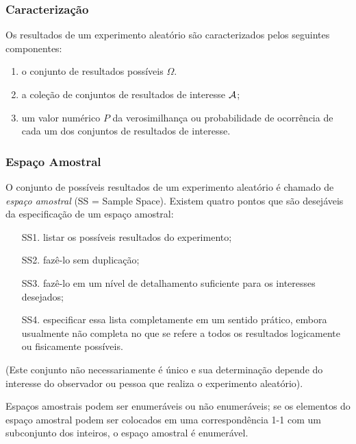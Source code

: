 \begin{frame}
\frametitle{\textbf{Caracterização}}
\baselineskip=13pt
\begin{block}{}

Os resultados de um experimento aleatório são caracterizados pelos
seguintes componentes:

\begin{enumerate}
	\item o conjunto de resultados possíveis $\Omega.$ 
	\item a coleção de conjuntos de resultados de interesse ${\cal A}$;
	\item um valor numérico $P$ da verosimilhança ou probabilidade de
	ocorrência de cada um dos conjuntos de resultados de interesse.
\end{enumerate}

\end{block}
\end{frame}

%
\begin{frame}
\frametitle{\textbf{Espaço Amostral}}
\baselineskip=13pt
\begin{block}{}


O conjunto de possíveis resultados de um experimento aleatório é
chamado de {\em espaço amostral}  (SS = Sample Space). Existem quatro pontos que são
desejáveis da especificação de um espaço amostral:

\begin{enumerate}
\item[SS1.] listar os possíveis resultados do experimento;

\item[SS2.] fazê-lo sem duplicação;

\item[SS3.] fazê-lo em um nível de detalhamento suficiente para os
interesses desejados;

\item[SS4.] especificar essa lista completamente em um sentido
prático, embora usualmente não completa no que se refere a todos os
resultados logicamente ou fisicamente possíveis.
\end{enumerate}

(Este conjunto não necessariamente é único e sua
determinação depende do interesse do observador ou pessoa que realiza o
experimento aleatório).

\end{block}
Espaços amostrais podem ser enumeráveis ou não enumeráveis;
se os elementos do espaço amostral podem ser colocados em uma correspondência 1-1 com um subconjunto
dos inteiros, o espaço amostral é enumerável.
\end{frame}
%
%
%



